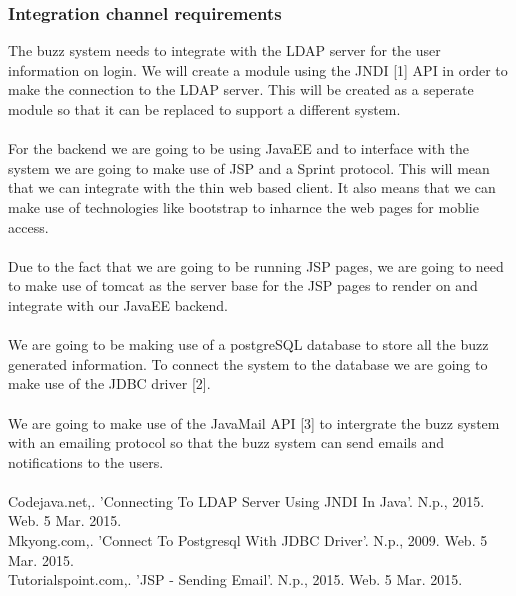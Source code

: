 \subsubsection{Integration channel requirements}
The buzz system needs to integrate with the LDAP server for the user information on login. We will create a module using the JNDI [1] API in order to make the connection to the LDAP server. This will be created as a seperate module so that it can be replaced to support a different system.\\
\\
For the backend we are going to be using JavaEE and to interface with the system we are going to make use of JSP and a Sprint protocol. This will mean that we can integrate with the thin web based client. It also means that we can make use of technologies like bootstrap to inharnce the web pages for moblie access.\\
\\
Due to the fact that we are going to be running JSP pages, we are going to need to make use of tomcat as the server base for the JSP pages to render on and integrate with our JavaEE backend.\\
\\
We are going to be making use of a postgreSQL database to store all the buzz generated information. To connect the system to the database we are going to make use of the JDBC driver [2].\\
\\
We are going to make use of the JavaMail API [3] to intergrate the buzz system with an emailing protocol so that the buzz system can send emails and notifications to the users.\\
\\
Codejava.net,. 'Connecting To LDAP Server Using JNDI In Java'. N.p., 2015. Web. 5 Mar. 2015.  
\\
Mkyong.com,. 'Connect To Postgresql With JDBC Driver'. N.p., 2009. Web. 5 Mar. 2015.
\\
Tutorialspoint.com,. 'JSP - Sending Email'. N.p., 2015. Web. 5 Mar. 2015.